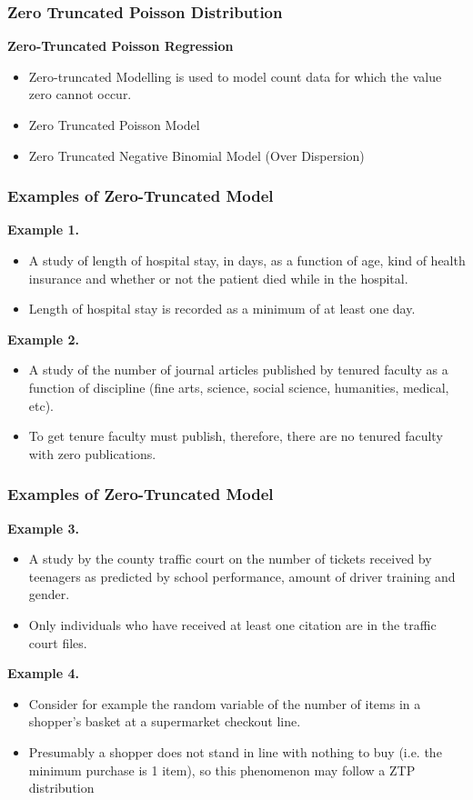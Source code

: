 \documentclass[MASTER.tex]{subfiles}
\begin{document}
	\begin{frame}
		\frametitle{Zero Truncated Poisson Distribution}
		\Large
		\textbf{Zero-Truncated Poisson Regression}
		\begin{itemize}
		\item Zero-truncated Modelling is used to model count data for which the value zero cannot occur.
		\item Zero Truncated Poisson Model 
		\item Zero Truncated Negative Binomial Model (Over Dispersion)
		\end{itemize}
		
		\end{frame}
\begin{frame}
	\frametitle{Examples of Zero-Truncated Model}
	
	\textbf{Example 1.}
	\begin{itemize}
		\item A study of length of hospital stay, in days, as a function of age, kind of health insurance and whether or not the patient died while in the hospital. 
		\item Length of hospital stay is recorded as a minimum of at least one day.
	\end{itemize}

	\textbf{Example 2.}
	\begin{itemize} 
		\item A study of the number of journal articles published by tenured faculty as a function of discipline (fine arts, science, social science, humanities, medical, etc).
		\item To get tenure faculty must publish, therefore, there are no tenured faculty with zero publications.
	\end{itemize}
\end{frame}
\begin{frame}
	\frametitle{Examples of Zero-Truncated Model}
	\textbf{Example 3.}
	\begin{itemize} 
		\item A study by the county traffic court on the number of tickets received by teenagers as predicted by school performance, amount of driver training and gender.
		\item Only individuals who have received at least one citation are in the traffic court files.
	\end{itemize}

	\textbf{Example 4.}
\begin{itemize}
	\item 
Consider for example the random variable of the number of items in a shopper's basket at a supermarket checkout line. 
\item Presumably a shopper does not stand in line with nothing to buy (i.e. the minimum purchase is 1 item), so this phenomenon may follow a ZTP distribution
	\end{itemize}
\end{frame}
\end{document}
